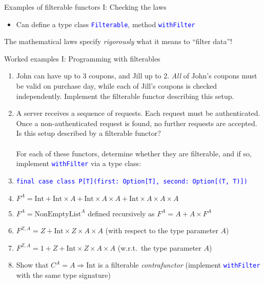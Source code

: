 \documentclass[english]{beamer}
\begin{document}
\begin{frame}{Examples of filterable functors I: Checking the laws}
\begin{itemize}
\begin{itemize}
breaks law 3
\item $F^{A}\equiv A$ \textendash{} must define $\text{filter}\left(p^{A\Rightarrow\text{Boolean}}\right)\left(x^{A}\right)=x$,
breaking law 4
\item $F^{A}\equiv A\times\left(1+A\right)$ \textendash{} unable to remove
the first $A$, breaking law 4
\end{itemize}
\item Can define a type class \texttt{\textcolor{blue}{\footnotesize{}Filterable}},
method \texttt{\textcolor{blue}{\footnotesize{}withFilter}} 
\end{itemize}
The mathematical laws specify \emph{rigorously} what it means to ``filter
data''!
\end{frame}

\begin{frame}{Worked examples I: Programming with filterables}
\begin{enumerate}
\item John can have up to 3 coupons, and Jill up to 2. \emph{All} of John's
coupons must be valid on purchase day, while each of Jill's coupons
is checked independently. Implement the filterable functor describing
this setup.
\item A server receives a sequence of requests. Each request must be authenticated.
Once a non-authenticated request is found, no further requests are
accepted. Is this setup described by a filterable functor?\\
\ \\
For each of these functors, determine whether they are filterable,
and if so, implement \texttt{\textcolor{blue}{\footnotesize{}withFilter}}
via a type class:
\item \texttt{\textcolor{blue}{\footnotesize{}final case class P{[}T{]}(first:\ Option{[}T{]},
second:\  Option{[}(T, T){]})}}{\footnotesize \par}
\item $F^{A}=\text{Int}+\text{Int}\times A+\text{Int}\times A\times A+\text{Int}\times A\times A\times A$
\item $F^{A}=\text{NonEmptyList}^{A}$ defined recursively as $F^{A}=A+A\times F^{A}$ 
\item $F^{Z,A}=Z+\text{Int}\times Z\times A\times A$ (with respect to the
type parameter $A$)
\item $F^{Z,A}=1+Z+\text{Int}\times Z\times A\times A$ (w.r.t.\ the type
parameter $A$)
\item Show that $C^{A}=A\Rightarrow\text{Int}$ is a filterable \emph{contrafunctor}
(implement \texttt{\textcolor{blue}{\footnotesize{}withFilter}} with
the same type signature)
\end{enumerate}
\end{frame}
\end{document}
